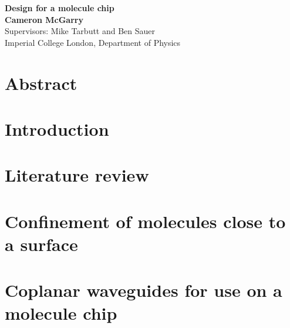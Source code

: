 \documentclass[
 aps,
 prb,
 a4paper,
 superscriptaddress,
 notitlepage,
 nofootinbib,
 preprint %
]{revtex4-1}
\begin{document}

\begin{titlepage}
  \begin{center}
    \vspace*{1cm}
    \textbf{Design for a molecule chip} \\
    \vspace{1.5cm}
     \textbf{Cameron McGarry} \\
    \vspace{0.5cm}
     Supervisors: Mike Tarbutt and Ben Sauer \\
    \vspace{0.5cm}
     {Imperial College London, Department of Physics} \\
  \end{center}
\end{titlepage}



\section*{Abstract}

\clearpage

\tableofcontents
\clearpage

\setcounter{page}{3} 


\section{Introduction}


\section{Literature review}


\section{Confinement of molecules close to a surface}


\section{Coplanar waveguides for use on a molecule chip}
\label{sec:cpw}

\end{document}
